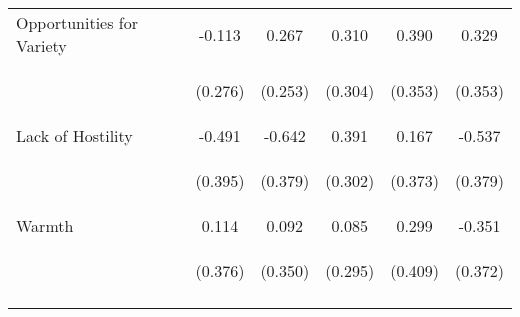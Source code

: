 \begin{tabular}{lccccc}
\noalign{\smallskip}Opportunities for Variety & -0.113 & 0.267 & 0.310 & 0.390 & 0.329\\
 & \begin{footnotesize}(0.276)\end{footnotesize} & \begin{footnotesize}(0.253)\end{footnotesize} & \begin{footnotesize}(0.304)\end{footnotesize} & \begin{footnotesize}(0.353)\end{footnotesize} & \begin{footnotesize}(0.353)\end{footnotesize}\\
\noalign{\smallskip}Lack of Hostility & -0.491 & -0.642 & 0.391 & 0.167 & -0.537\\
 & \begin{footnotesize}(0.395)\end{footnotesize} & \begin{footnotesize}(0.379)\end{footnotesize} & \begin{footnotesize}(0.302)\end{footnotesize} & \begin{footnotesize}(0.373)\end{footnotesize} & \begin{footnotesize}(0.379)\end{footnotesize}\\
\noalign{\smallskip}Warmth & 0.114 & 0.092 & 0.085 & 0.299 & -0.351\\
 & \begin{footnotesize}(0.376)\end{footnotesize} & \begin{footnotesize}(0.350)\end{footnotesize} & \begin{footnotesize}(0.295)\end{footnotesize} & \begin{footnotesize}(0.409)\end{footnotesize} & \begin{footnotesize}(0.372)\end{footnotesize}\\
\noalign{\smallskip}\hline\end{tabular}\\
